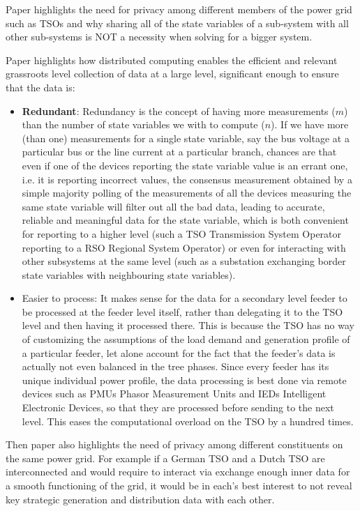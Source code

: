 \documentclass[journal]{IEEEtran}
\begin{document}
Paper \cite{aladinAlgorithmPaper} highlights the need for privacy among different members of the power grid such as TSOs and why sharing all of the state variables of a sub-system with all other sub-systems is NOT a necessity when solving for a bigger system.

Paper \cite{gomez_exposito_multilevelStateEstimationParadigm} highlights how distributed computing enables the efficient and relevant grassroots level collection of data at a large level, significant enough to ensure that the data is:
\begin{itemize}
	\item \textbf{Redundant}: Redundancy is the concept of having more measurements ($m$) than the number of state variables we with to compute ($n$). If we have more (than one) measurements for a single state variable, say the bus voltage at a particular bus or the line current at a particular branch, chances are that even if one of the devices reporting the state variable value is an errant one, i.e. it is reporting incorrect values, the consensus measurement obtained by a simple majority polling of the measurements of all the devices measuring the same state variable will filter out all the bad data, leading to accurate, reliable and meaningful data for the state variable, which is both convenient for reporting to a higher level (such a TSO Transmission System Operator reporting to a RSO Regional System Operator) or even for interacting with other subsystems at the same level (such as a substation exchanging border state variables with neighbouring state variables).
	\item Easier to process: It makes sense for the data for a secondary level feeder to be processed at the feeder level itself, rather than delegating it to the TSO level and then having it processed there. This is because the TSO has no way of customizing the assumptions of the load demand and generation profile of a particular feeder, let alone account for the fact that the feeder's data is actually not even balanced in the tree phases. Since every feeder has its unique individual power profile, the data processing is best done via remote devices such as PMUs Phasor Measurement Units and IEDs Intelligent Electronic Devices, so that they are processed before sending to the next level. This eases the computational overload on the TSO by a hundred times. \cite{gomez_exposito_multilevelStateEstimationParadigm}
\end{itemize}

Then paper \cite{aladinAlgorithmPaper} also highlights the need of privacy among different constituents on the same power grid. For example if a German TSO and a Dutch TSO are interconnected and would require to interact via exchange enough inner data for a smooth functioning of the grid, it would be in each's best interest to not reveal key strategic generation and distribution data with each other.
\end{document}
